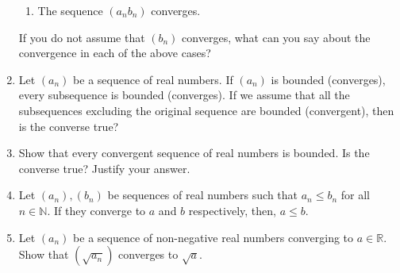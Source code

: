 \begin{enumerate}[label=(\arabic*)]
\begin{enumerate}[nosep]
		\item The sequence $(a_nb_n)$ converges.
	\end{enumerate}
	If you do not assume that $(b_n)$ converges, what can you say about the convergence in each of the above cases?
	\item Let $(a_n)$ be a sequence of real numbers. If $(a_n)$ is bounded (converges), every subsequence is bounded (converges). If we assume that all the subsequences excluding the original sequence are bounded (convergent), then is the converse true?
	\item Show that every convergent sequence of real numbers is bounded. Is the converse true? Justify your answer.
	\item Let $(a_n), (b_n)$ be sequences of real numbers such that $a_n \le b_n$ for all $n \in \mathbb{N}.$ If they converge to $a$ and $b$ respectively, then, $a \le b.$
	\item Let $(a_n)$ be a sequence of non-negative real numbers converging to $a \in \mathbb{R}.$ Show that $(\sqrt{a_n})$ converges to $\sqrt{a}.$
\end{enumerate}